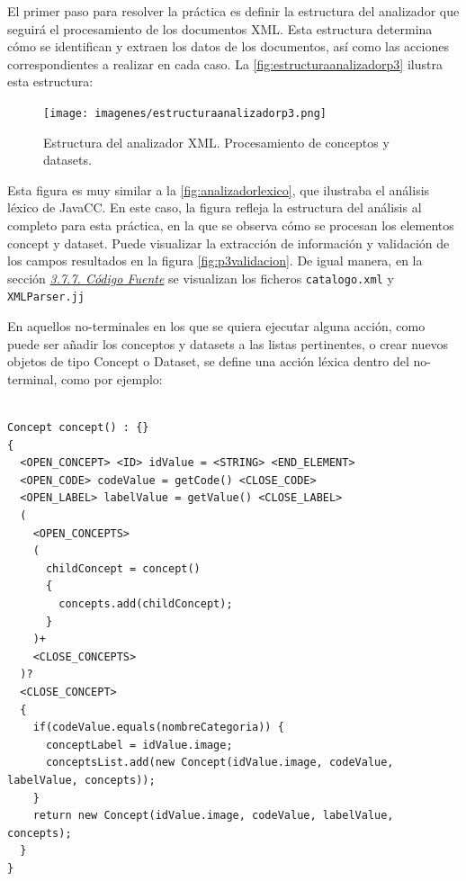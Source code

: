 El primer paso para resolver la práctica es definir la estructura del analizador que seguirá el procesamiento de los documentos XML. Esta estructura determina cómo se identifican y extraen los datos de los documentos, así como las acciones correspondientes a realizar en cada caso. La \autoref{fig:estructuraanalizadorp3} ilustra esta estructura:




\begin{figure}[H]
	\centering
	\texttt{[image: imagenes/estructuraanalizadorp3.png]}
	\caption{\label{fig:estructuraanalizadorp3}Estructura del analizador XML. Procesamiento de conceptos y datasets.}
\end{figure}

Esta figura es muy similar a la \autoref{fig:analizadorlexico}, que ilustraba el análisis léxico de JavaCC. En este caso, la figura refleja la estructura del análisis al completo para esta práctica, en la que se observa cómo se procesan los elementos concept y dataset. 
Puede visualizar la extracción de información y validación de los campos resultados en la figura \autoref{fig:p3validacion}. De igual manera, en la sección \hyperref[sec:codigofuentep3]{\textit{3.7.7. Código Fuente}} se visualizan los ficheros \lstinline|catalogo.xml| y \lstinline|XMLParser.jj|

 En aquellos no-terminales en los que se quiera ejecutar alguna acción, como puede ser añadir los conceptos y datasets a las listas pertinentes, o crear nuevos objetos de tipo Concept o Dataset, se define una acción léxica dentro del no-terminal, como por ejemplo:

\begin{lstlisting}

Concept concept() : {}
{
  <OPEN_CONCEPT> <ID> idValue = <STRING> <END_ELEMENT>
  <OPEN_CODE> codeValue = getCode() <CLOSE_CODE>
  <OPEN_LABEL> labelValue = getValue() <CLOSE_LABEL>
  (
    <OPEN_CONCEPTS>
    (
      childConcept = concept()
      {
        concepts.add(childConcept);
      }
    )+
    <CLOSE_CONCEPTS>
  )?
  <CLOSE_CONCEPT>
  {
    if(codeValue.equals(nombreCategoria)) {
      conceptLabel = idValue.image;
      conceptsList.add(new Concept(idValue.image, codeValue, labelValue, concepts));
    }
    return new Concept(idValue.image, codeValue, labelValue, concepts);
  }
}

\end{lstlisting}

